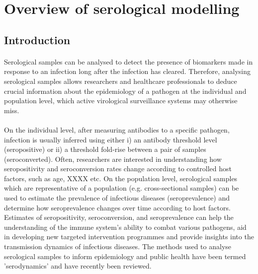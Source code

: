 \section{Overview of serological modelling}

\subsection{Introduction}

\paragraph{}Serological samples can be analysed to detect the presence of biomarkers made in response to an infection long after the infection has cleared.\cite{Cutts2016} Therefore, analysing serological samples allows researchers and healthcare professionals to deduce crucial information about the epidemiology of a pathogen at the individual and population level, which active virological surveillance systems may otherwise miss.

\paragraph{}On the individual level, after measuring antibodies to a specific pathogen, infection is usually inferred using either i) an antibody threshold level (seropositive) or ii) a threshold fold-rise between a pair of samples (seroconverted).\cite{Haselbeck2022} Often, researchers are interested in understanding how seropositivity and seroconversion rates change according to controlled host factors, such as age, XXXX etc.\cite{} On the population level, serological samples which are representative of a population (e.g. cross-sectional samples) can be used to estimate the prevalence of infectious diseases (seroprevalence) and determine how seroprevalence changes over time according to host factors.\cite{} Estimates of seropositivity, seroconversion, and seroprevalence can help the understanding of the immune system's ability to combat various pathogens, aid in developing new targeted intervention programmes and provide insights into the transmission dynamics of infectious diseases. The methods used to analyse serological samples to inform epidemiology and public health have been termed 'serodynamics' and have recently been reviewed. \cite{Hay2023}

